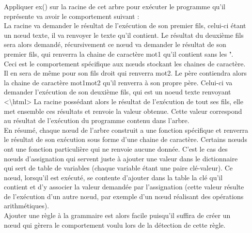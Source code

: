 \documentclass[a4paper,10pt]{article}
\begin{document}
Appliquer \textrm{ex()} sur la racine de cet arbre pour exécuter le programme qu'il représente va avoir le comportement suivant : \\
La racine va demander le résultat de l'exécution de son premier fils, celui-ci étant un nœud texte, il va renvoyer le texte qu'il contient. Le résultat du deuxième fils sera alors
demandé, récursivement ce nœud va demander le résultat de son premier fils, qui renverra la chaine de caractère \textrm{mot1} qu'il contient sans les \textbf{'}. Ceci est le comportement
spécifique aux nœuds stockant les chaines de caractère. Il en sera de même pour son fils droit qui renverra \textrm{mot2}. Le père contiendra alors la chaine de
caractère \textrm{mot1mot2} qu'il renverra à son propre père. Celui-ci va demander l'exécution de son deuxième fils, qui est un noeud texte renvoyant \textrm{<\textbackslash html>}
La racine possédant alors le résultat de l'exécution de tout ses fils, elle met ensemble ces résultats et renvoie la valeur obtenue. Cette valeur correspond au résultat de 
l'exécution du programme contenu dans l'arbre.\\

En résumé, chaque nœud de l'arbre construit a une fonction spécifique et renverra le résultat de son exécution sous forme d'une chaine de caractère.
Certains nœuds ont une fonction particulière qui ne renvoie aucune donnée. C'est le cas des nœuds d'assignation qui servent juste à ajouter une valeur dans le dictionnaire qui sert de 
table de variables (chaque variable étant une paire clé-valeur). Ce nœud, lorsqu'il est exécuté, se contente d'ajouter dans la table la clé qu'il contient et d'y associer la valeur demandée
par l'assignation (cette valeur résulte de l'exécution d'un autre nœud, par exemple d'un nœud réalisant des opérations arithmétiques). \\
Ajouter une règle à la grammaire est alors facile puisqu'il suffira de créer un nœud qui gèrera le comportement voulu lors de la détection de cette règle. 
\end{document}
